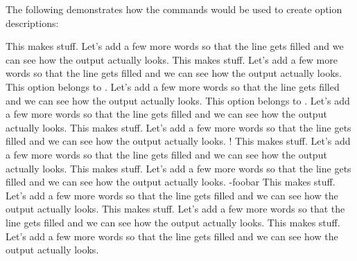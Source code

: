 \documentclass[load-preamble+,babel-options={ngerman,english}]{cnltx-doc}
\begin{document}
The following demonstrates how the commands would be used to create option
descriptions:
\begin{sourcecode}
  \begin{options}
      This makes stuff.  Let's add a few more words so that the line gets
      filled and we can see how the output actually looks.
      This makes stuff.  Let's add a few more words so that the line gets
      filled and we can see how the output actually looks.
      This option belongs to .  Let's add a few more words so
      that the line gets filled and we can see how the output actually
      looks.
      This option belongs to .  Let's add a few more words so
      that the line gets filled and we can see how the output actually
      looks.
    \Default
      This makes stuff.  Let's add a few more words so that the line gets
      filled and we can see how the output actually looks.
    \Default!
      This makes stuff.  Let's add a few more words so that the line gets
      filled and we can see how the output actually looks.
      This makes stuff.  Let's add a few more words so that the line gets
      filled and we can see how the output actually looks.
    \keyval-{foo}{bar}
      This makes stuff.  Let's add a few more words so that the line gets
      filled and we can see how the output actually looks.
      This makes stuff.  Let's add a few more words so that the line gets
      filled and we can see how the output actually looks.
      This makes stuff.  Let's add a few more words so that the line gets
      filled and we can see how the output actually looks.
  \end{options}
\end{sourcecode}
\end{document}
